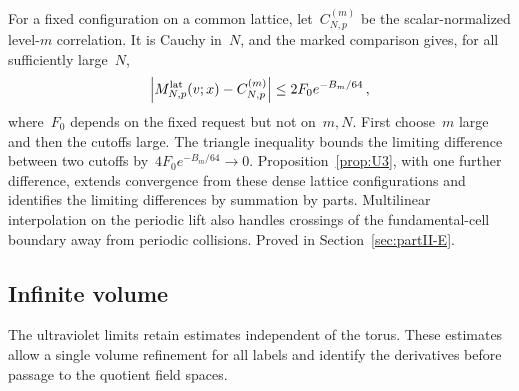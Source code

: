 For a fixed configuration on a common lattice, let~$C_{N,p}^{(m)}$ be the scalar-normalized level-$m$ correlation. It is Cauchy in~$N$, and the marked comparison gives, for all sufficiently large~$N$,
\begin{equation}\label{eq:U4-comparison}
\left|M^{\mathrm{lat}}_{N,p}(v;x)-C_{N,p}^{(m)}\right|\le2F_0e^{-B_m/64}\,,
\end{equation}
where~$F_0$ depends on the fixed request but not on~$m,N$. First choose~$m$ large and then the cutoffs large. The triangle inequality bounds the limiting difference between two cutoffs by~$4F_0e^{-B_m/64}\to0$. Proposition~\ref{prop:U3}, with one further difference, extends convergence from these dense lattice configurations and identifies the limiting differences by summation by parts. Multilinear interpolation on the periodic lift also handles crossings of the fundamental-cell boundary away from periodic collisions. Proved in Section~\ref{sec:partII-E}.

\subsection{Infinite volume}

The ultraviolet limits retain estimates independent of the torus. These estimates
allow a single volume refinement for all labels and identify the derivatives
before passage to the quotient field spaces.

